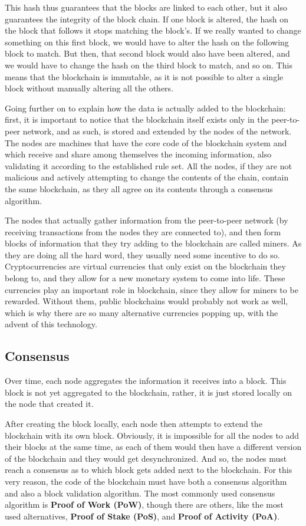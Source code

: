     This hash thus guarantees that the blocks are linked to each other, but it also guarantees the integrity of the block chain. If one block is altered, the hash on the block that follows it stops matching the block's. If we really wanted to change something on this  first block, we would have to alter the hash on the following block to match. But then, that second block would also have been altered, and we would have to change the hash on the third block to match, and so on. This means that the blockchain is immutable, as it is not possible to alter a single block without manually altering all the others. 
    
    Going further on to explain how the data is actually added to the blockchain: first, it is important to notice that the blockchain itself exists only in the peer-to-peer network, and as such, is stored and extended by the nodes of the network. The nodes are machines that have the core code of the blockchain system and which receive and share among themselves the incoming information, also validating it according to the established rule set. All the nodes, if they are not malicious and actively attempting to change the contents of the chain, contain the same blockchain, as they all agree on its contents through a consensus algorithm. 
    
     The nodes that actually gather information from the peer-to-peer network (by receiving transactions from the nodes they are connected to), and then form blocks of information that they try adding to the blockchain are called miners. As they are doing all the hard word, they usually need some incentive to do so. Cryptocurrencies are virtual currencies that only exist on the blockchain they belong to, and they allow for a new monetary system to come into life. These currencies play an important role in blockchain, since they allow for miners to be rewarded. Without them, public blockchains would probably not work as well, which is why there are so many alternative currencies popping up, with the advent of this technology. 
    
    \subsection{Consensus}
    Over time, each node aggregates the information it receives into a block. This block is not yet aggregated to the blockchain, rather, it is just stored locally on the node that created it. 
    
    After creating the block locally, each node then attempts to extend the blockchain with its own block. Obviously, it is impossible for all the nodes to add their blocks at the same time, as each of them would then have a different version of the blockchain and they would get desynchronized. And so, the nodes must reach a consensus as to which block gets added next to the blockchain. For this very reason, the code of the blockchain must have both a consensus algorithm and also a block validation algorithm. The most commonly used consensus algorithm is \textbf{Proof of Work (PoW)}, though there are others, like the most used alternatives, \textbf{Proof of Stake (PoS)}, and \textbf{Proof of Activity (PoA)}. 
    
